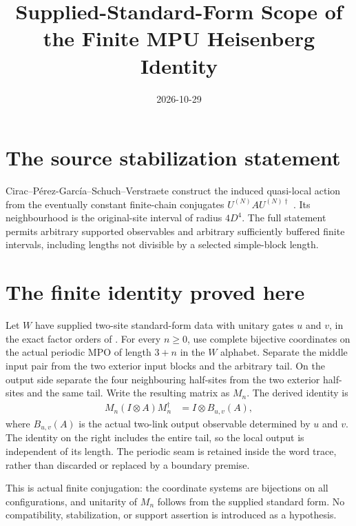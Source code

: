 \documentclass[11pt]{article}
\title{Supplied-Standard-Form Scope of the Finite MPU Heisenberg Identity}
\author{}
\date{2026-10-29}
\begin{document}
\maketitle
{}

\section{The source stabilization statement}

Cirac--P\'erez-Garc\'ia--Schuch--Verstraete construct the induced
quasi-local action from the eventually constant finite-chain conjugates
$U^{(N)}A U^{(N)\dagger}$
\cite[equation~\texttt{eq:appendix-1}, lines~2300--2306]{Cirac2017MPU}.
Its neighbourhood is the original-site interval of radius $4D^4$.
The full statement permits arbitrary supported observables and arbitrary
sufficiently buffered finite intervals, including lengths not divisible
by a selected simple-block length.

\section{The finite identity proved here}

Let $W$ have supplied two-site standard-form data with unitary gates
$u$ and $v$, in the exact factor orders of
\cite[\texttt{StandardForm} and Definition~\texttt{SF}, lines~603--622]{Cirac2017MPU}.
For every $n\ge0$, use complete bijective coordinates on the actual
periodic MPO of length $3+n$ in the $W$ alphabet. Separate the middle
input pair from the two exterior input blocks and the arbitrary tail.
On the output side separate the four neighbouring half-sites from the
two exterior half-sites and the same tail. Write the resulting matrix as
$M_n$. The derived identity is
\begin{align}
    M_n(I\otimes A)M_n^\dagger
     & =I\otimes B_{u,v}(A),
    \label{eq:mpu_qca_complete_block_finite_heisenberg}
\end{align}
where $B_{u,v}(A)$ is the actual two-link output observable determined by
$u$ and $v$. The identity on the right includes the entire tail, so the
local output is independent of its length. The periodic seam is retained
inside the word trace, rather than discarded or replaced by a boundary
premise.

This is actual finite conjugation: the coordinate systems are bijections
on all configurations, and unitarity of $M_n$ follows from the supplied
standard form. No compatibility, stabilization, or support assertion is
introduced as a hypothesis.
\end{document}
